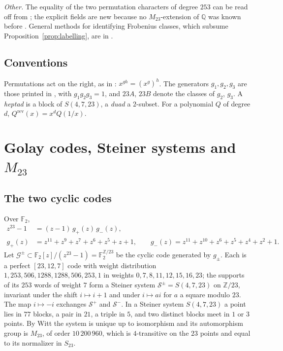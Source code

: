 \documentclass[11pt]{amsart}
\theoremstyle{definition}
\newcommand{\QQ}{\mathbb{Q}}
\newcommand{\ZZ}{\mathbb{Z}}
\newcommand{\FF}{\mathbb{F}}
\newcommand{\rev}{\mathrm{rev}}
\newcommand{\M}{M_{23}}
\newcommand{\cG}{\mathcal{G}}
\newcommand{\cS}{\mathcal{S}}
\begin{document}
\emph{Other.} The equality of the two permutation characters of degree $253$ can be read off from \cite{ATLAS}; the explicit fields are new because no $\M$-extension of $\QQ$ was known before \cite{HJLPPZ26}. General methods for identifying Frobenius classes, which subsume Proposition~\ref{prop:labelling}, are in \cite{DD13}.

\subsection{Conventions}
Permutations act on the right, as in \cite{HJLPPZ26}: $x^{gh}=(x^g)^h$. The generators $g_1,g_2,g_3$ are those printed in \cite[\S3.1]{HJLPPZ26}, with $g_1g_2g_3=1$, and $23A$, $23B$ denote the classes of $g_2$, $g_3$. A \emph{heptad} is a block of $S(4,7,23)$, a \emph{duad} a $2$-subset. For a polynomial $Q$ of degree $d$, $Q^{\rev}(x)=x^dQ(1/x)$.

\section{Golay codes, Steiner systems and \texorpdfstring{$\M$}{M23}}\label{sec:golay}

\subsection{The two cyclic codes}
Over $\FF_2$,
\begin{align*}
z^{23}-1&=(z-1)\,g_+(z)\,g_-(z),\\
g_+(z)&=z^{11}+z^9+z^7+z^6+z^5+z+1,\qquad g_-(z)=z^{11}+z^{10}+z^6+z^5+z^4+z^2+1 .
\end{align*}
Let $\cG^{\pm}\subset\FF_2[z]/(z^{23}-1)=\FF_2^{\ZZ/23}$ be the cyclic code generated by $g_\pm$. Each is a perfect $[23,12,7]$ code with weight distribution $1,253,506,1288,1288,506,253,1$ in weights $0,7,8,11,12,15,16,23$; the supports of its $253$ words of weight $7$ form a Steiner system $\cS^{\pm}=S(4,7,23)$ on $\ZZ/23$, invariant under the shift $i\mapsto i+1$ and under $i\mapsto ai$ for $a$ a square modulo $23$. The map $i\mapsto-i$ exchanges $\cS^+$ and $\cS^-$. In a Steiner system $S(4,7,23)$ a point lies in $77$ blocks, a pair in $21$, a triple in $5$, and two distinct blocks meet in $1$ or $3$ points. By Witt \cite{Witt38a,Witt38b} the system is unique up to isomorphism and its automorphism group is $\M$, of order $10\,200\,960$, which is $4$-transitive on the $23$ points and equal to its normalizer in $S_{23}$.
\end{document}

